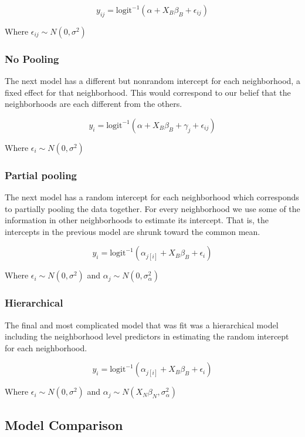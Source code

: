 \documentclass{IEEEtran}
\begin{document}
$$ y_{ij} = \text{logit}^{-1}\left( \alpha + X_{B}\beta_{B} + \epsilon_{ij} \right) $$

Where $\epsilon_{ij} \sim N(0, \sigma^2)$

\subsubsection{No Pooling}

The next model has a different but nonrandom intercept for each neighborhood, a fixed effect for that neighborhood. This would correspond to our belief that the neighborhoods are each different from the others. 

$$ y_{i} = \text{logit}^{-1}\left( \alpha + X_{B}\beta_{B} +  \gamma_j + \epsilon_{ij} \right) $$

Where $\epsilon_i \sim N(0, \sigma^2)$ 

\subsubsection{Partial pooling}

The next model has a random intercept for each neighborhood which corresponds to partially pooling the data together. For every neighborhood we use some of the information in other neighborhoods to estimate its intercept. That is, the intercepts in the previous model are shrunk toward the common mean. 

$$ y_{i} = \text{logit}^{-1}\left( \alpha_{j[i]} + X_{B}\beta_{B} +  \epsilon_i \right) $$

Where $\epsilon_i \sim N(0, \sigma^2)$ and $\alpha_j \sim N(0, \sigma^2_\alpha)$

\subsubsection{Hierarchical}

The final and most complicated model that was fit was a hierarchical model including the neighborhood level predictors in estimating the random intercept for each neighborhood. 

$$ y_{i} = \text{logit}^{-1}\left( \alpha_{j[i]} + X_{B}\beta_{B} +  \epsilon_i \right) $$

Where $\epsilon_i \sim N(0, \sigma^2)$ and $\alpha_j \sim N(X_N \beta_N, \sigma^2_\alpha)$


\subsection{Model Comparison}
\end{document}
